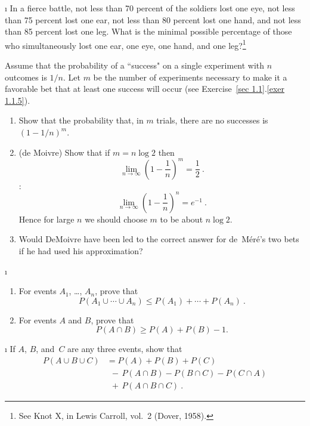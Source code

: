 \begin{LJSItem}
\i\label{exer 1.2.15} In a fierce battle, not less than 70 percent of the
soldiers lost one
eye, not less than 75 percent lost one ear, not less than 80 percent lost one
hand, and not less than 85 percent lost one leg.  What is the minimal
possible
percentage of those who simultaneously lost one ear, one eye, one hand, and
one
leg?\footnote{See Knot X, in Lewis Carroll, 
vol.~2 (Dover, 1958).}

\istar\label{exer 1.2.16}
Assume that the probability of a ``success" on
a single experiment with $n$ outcomes is $1/n$.  Let $m$ be the number of
experiments necessary to make it a favorable bet that at least one success
will
occur (see Exercise~\ref{sec 1.1}.\ref{exer 1.1.5}).

\begin{enumerate}
\item Show that the probability that, in $m$ trials, there are no successes
is $(1 - 1/n)^m$.

\item (de Moivre) Show that if $m = n \log 2$ then
$$
\lim_{n \to \infty} \left(1 - \frac1n \right)^m = \frac12\ .
$$
:
$$
\lim_{n \to \infty} \left(1 - \frac1n \right)^n = e^{-1}\ .
$$
Hence for large $n$ we should choose $m$ to be about $n \log 2$.

\item Would DeMoivre have been led to the correct answer for de~M\'er\'e's
two bets if he had used his approximation?
\end{enumerate}

\i\label{exer 1.2.17}
\begin{enumerate}
\item For events $A_1$, \dots, $A_n$, prove that 
$$P(A_1 \cup \cdots \cup A_n) \leq P(A_1) + \cdots + P(A_n)\ .$$
\item For events $A$ and $B$, prove that
$$
P(A \cap B) \geq P(A) + P(B) - 1.
$$
\end{enumerate}

\i\label{exer 1.2.18}
If $A$, $B$, and~$C$ are any three events, show that
$$\begin{array}{ll}
P(A \cup B \cup C) &= P(A) + P(B) + P(C) \\
                   &\ \  -\, P(A \cap B) - P(B \cap C) - P(C \cap A) \\
                   &\ \  +\, P(A \cap B \cap C)\ .
\end{array}
$$


\end{LJSItem}

